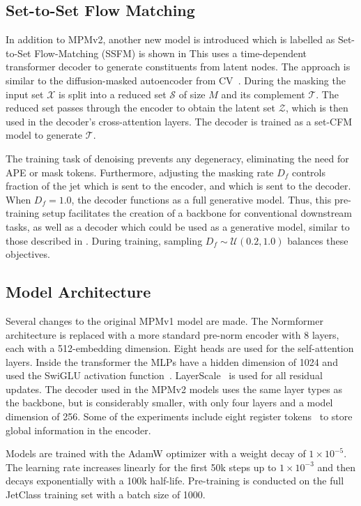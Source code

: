\subsection{Set-to-Set Flow Matching}

In addition to MPMv2, another new model is introduced which is labelled as Set-to-Set Flow-Matching (SSFM) is shown in 
This uses a time-dependent transformer decoder to generate constituents from latent nodes.
The approach is similar to the diffusion-masked autoencoder from CV~\cite{diffmae}.
During the masking the input set $\mathcal{X}$ is split into a reduced set $\mathcal{S}$ of size $M$ and its complement $\mathcal{T}$.
The reduced set passes through the encoder to obtain the latent set $\mathcal{Z}$, which is then used in the decoder's cross-attention layers.
The decoder is trained as a set-CFM model to generate $\mathcal{T}$.

The training task of denoising prevents any degeneracy, eliminating the need for APE or mask tokens.
Furthermore, adjusting the masking rate $D_f$ controls fraction of the jet which is sent to the encoder, and which is sent to the decoder.
When $D_f=1.0$, the decoder functions as a full generative model.
Thus, this pre-training setup facilitates the creation of a backbone for conventional downstream tasks, as well as a decoder which could be used as a generative model, similar to those described in .
During training, sampling $D_f \sim \mathcal{U}(0.2, 1.0)$ balances these objectives.

\subsection{Model Architecture}

Several changes to the original MPMv1 model are made.
The Normformer architecture is replaced with a more standard pre-norm encoder with 8 layers, each with a 512-embedding dimension.
Eight heads are used for the self-attention layers.
Inside the transformer the MLPs have a hidden dimension of 1024 and used the SwiGLU activation function~\cite{SwiGLU}.
LayerScale~\cite{GoingDeeper} is used for all residual updates.
The decoder used in the MPMv2 models uses the same layer types as the backbone, but is considerably smaller, with only four layers and a model dimension of 256.
Some of the experiments include eight register tokens~\cite{VisionTransformersNeed} to store global information in the encoder.

Models are trained with the AdamW optimizer with a weight decay of $1 \times 10^{-5}$.
The learning rate increases linearly for the first 50k steps up to $1 \times 10^{-3}$ and then decays exponentially with a 100k half-life.
Pre-training is conducted on the full JetClass training set with a batch size of 1000.

